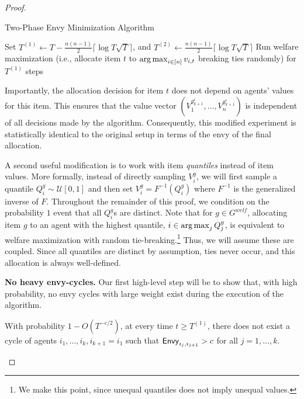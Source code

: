 \begin{proof}
    \begin{algorithm}[t]
\caption{Two-Phase Envy Minimization Algorithm}\label{algo:online envy for n agents}
\SetAlgoLined
\DontPrintSemicolon

Set $T^{(1)} \gets T - \frac{n(n - 1)}{2}\lceil \log T \sqrt{T} \rceil$, and $T^{(2)} \gets \frac{n(n - 1)}{2} \lceil \log T \sqrt{T} \rceil$\;
Run welfare maximization (i.e., allocate item $t$ to $\operatorname*{arg\,max}_{i \in [n]} v_{i,t}$ breaking ties randomly)  for $T^{(1)}$ steps \;
\end{algorithm}

    Importantly, the allocation decision for item $t$ does not depend on agents' values for this item. This ensures that the value vector $(V^{g^i_{k + 1}}_1, \ldots, V^{g^i_{k + 1}}_n)$ is independent of all decisions made by the algorithm. Consequently, this modified experiment is statistically identical to the original setup in terms of the envy of the final allocation.

    A second useful modification is to work with item \emph{quantiles} instead of item values. More formally, instead of directly sampling $V^g_i$, we will first sample a quantile $Q^g_i \sim \mathcal{U}[0, 1]$ and then set $V^g_i = F^{-1}(Q^g_i)$ where $F^{-1}$ is the generalized inverse of $F$. Throughout the remainder of this proof, we condition on the probability $1$ event that all $Q^g_i$s are distinct.
    Note that for $g \in G^{welf}$, allocating item $g$ to an agent with the highest quantile, $i \in \operatorname*{arg\,max}_{j} Q^g_j$, is equivalent to welfare maximization with random tie-breaking.\footnote{We make this point, since unequal quantiles does not imply unequal values.} Thus, we will assume these are coupled. Since all quantiles are distinct by assumption, ties never occur, and this allocation is always well-defined. 

    \textbf{No heavy envy-cycles.} Our first high-level step will be to show that, with high probability, no envy cycles with large weight exist during the execution of the algorithm.

    \begin{lemma}\label{lem:no-cycle}
        With probability $1 - O ( T^{-c/2}  )$, at every time $t \ge T^{(1)}$, there does not exist a cycle of agents $i_1, \ldots, i_k, i_{k+1}=i_1$ such that $\mathsf{Envy}_{i_j, i_{j + 1}} > c$ for all $j = 1, \ldots, k$. 
    \end{lemma}


\end{proof}
